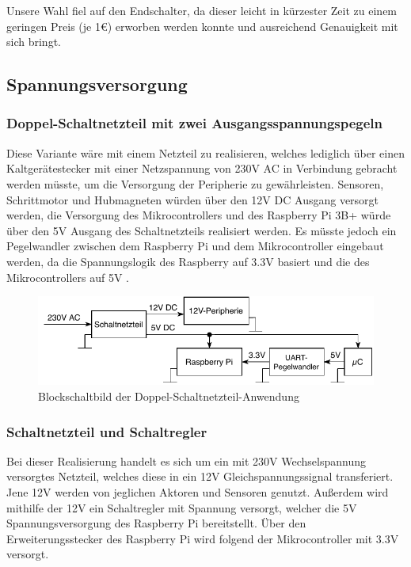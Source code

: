 Unsere Wahl fiel auf den Endschalter, da dieser leicht in kürzester Zeit zu einem geringen Preis (je 1€) erworben werden konnte und ausreichend Genauigkeit mit sich bringt.

\subsection{Spannungsversorgung}
\subsubsection{Doppel-Schaltnetzteil mit zwei Ausgangsspannungspegeln}
Diese Variante wäre mit einem Netzteil zu realisieren, welches lediglich über einen Kaltgerätestecker mit einer Netzspannung von 230V \acs{AC} in Verbindung gebracht werden müsste,
um die Versorgung der Peripherie zu gewährleisten.
Sensoren, Schrittmotor und Hubmagneten würden über den 12V \acs{DC} Ausgang versorgt werden,
die Versorgung des Mikrocontrollers und des Raspberry Pi 3B+ würde über den 5V Ausgang des Schaltnetzteils realisiert werden.
Es müsste jedoch ein Pegelwandler zwischen dem Raspberry Pi und dem Mikrocontroller eingebaut werden, da die Spannungslogik des Raspberry auf 3.3V basiert und die des Mikrocontrollers auf 5V .

\begin{figure}[htb]
    \centering
    \includegraphics[scale=1,page=1]{fig/elektro/DoppelSchaltnetzteil.pdf}
    \caption{Blockschaltbild der Doppel-Schaltnetzteil-Anwendung}
\end{figure}

\subsubsection{Schaltnetzteil und Schaltregler}
Bei dieser Realisierung handelt es sich um ein mit 230V Wechselspannung versorgtes Netzteil, welches diese in ein 12V Gleichspannungssignal transferiert.
Jene 12V werden von jeglichen Aktoren und Sensoren genutzt.
Außerdem wird mithilfe der 12V ein Schaltregler mit Spannung versorgt, welcher die 5V Spannungsversorgung des Raspberry Pi bereitstellt.
Über den Erweiterungsstecker des Raspberry Pi wird folgend der Mikrocontroller mit 3.3V versorgt.

